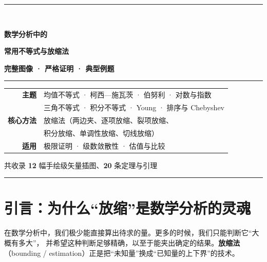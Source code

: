\documentclass[11pt,a4paper]{ctexart}
\providecommand{\kaishu}{}
\renewcommand{\kaishu}{\CJKfamily{kai}}
\theoremstyle{definition}
\theoremstyle{remark}
\begin{document}
\begin{titlepage}
\centering
\vspace*{2.2cm}

{\color{mainc}\rule{\linewidth}{1.6pt}}\\[0.9cm]

{\Huge\bfseries 数学分析中的\par}
\vspace{0.35cm}
{\Huge\bfseries 常用不等式与放缩法\par}
\vspace{0.35cm}
{\LARGE\bfseries 完整图像 · 严格证明 · 典型例题\par}

\vspace{0.6cm}
{\color{mainc}\rule{\linewidth}{1.6pt}}

\vspace{2.6cm}

{\large\kaishu
\begin{tabular}{rl}
\textbf{主题} & 均值不等式 · 柯西—施瓦茨 · 伯努利 · 对数与指数\\[3pt]
              & 三角不等式 · 积分不等式 · Young · 排序与 Chebyshev\\[3pt]
\textbf{核心方法} & 放缩法（两边夹、逐项放缩、裂项放缩、\\[3pt]
              & 积分放缩、单调性放缩、切线放缩）\\[3pt]
\textbf{适用} & 极限证明 · 级数敛散性 · 估值与比较\\[3pt]
\end{tabular}}

\vfill

{\large 共收录 \textbf{12} 幅手绘级矢量插图、\textbf{20} 条定理与引理}

\vspace{1.2cm}
{\color{mainc}\rule{0.45\linewidth}{0.8pt}}
\end{titlepage}

\tableofcontents
\newpage

\section{引言：为什么“放缩”是数学分析的灵魂}

在数学分析中，我们极少能直接算出待求的量。更多的时候，我们只能判断它“大概有多大”，
并希望这种判断足够精确，以至于能夹出确定的结果。\textbf{放缩法}
（bounding / estimation）正是把“未知量”换成“已知量的上下界”的技术。
\end{document}
